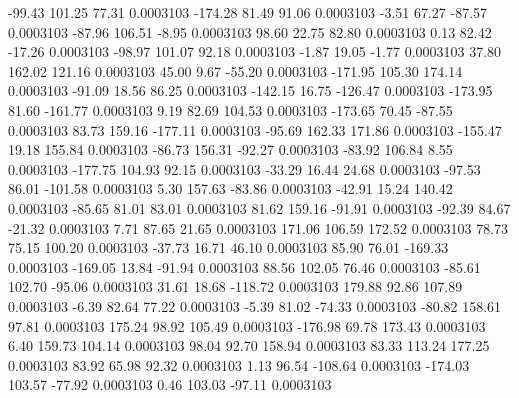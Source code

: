       -99.43      101.25       77.31     0.0003103
     -174.28       81.49       91.06     0.0003103
       -3.51       67.27      -87.57     0.0003103
      -87.96      106.51       -8.95     0.0003103
       98.60       22.75       82.80     0.0003103
        0.13       82.42      -17.26     0.0003103
      -98.97      101.07       92.18     0.0003103
       -1.87       19.05       -1.77     0.0003103
       37.80      162.02      121.16     0.0003103
       45.00        9.67      -55.20     0.0003103
     -171.95      105.30      174.14     0.0003103
      -91.09       18.56       86.25     0.0003103
     -142.15       16.75     -126.47     0.0003103
     -173.95       81.60     -161.77     0.0003103
        9.19       82.69      104.53     0.0003103
     -173.65       70.45      -87.55     0.0003103
       83.73      159.16     -177.11     0.0003103
      -95.69      162.33      171.86     0.0003103
     -155.47       19.18      155.84     0.0003103
      -86.73      156.31      -92.27     0.0003103
      -83.92      106.84        8.55     0.0003103
     -177.75      104.93       92.15     0.0003103
      -33.29       16.44       24.68     0.0003103
      -97.53       86.01     -101.58     0.0003103
        5.30      157.63      -83.86     0.0003103
      -42.91       15.24      140.42     0.0003103
      -85.65       81.01       83.01     0.0003103
       81.62      159.16      -91.91     0.0003103
      -92.39       84.67      -21.32     0.0003103
        7.71       87.65       21.65     0.0003103
      171.06      106.59      172.52     0.0003103
       78.73       75.15      100.20     0.0003103
      -37.73       16.71       46.10     0.0003103
       85.90       76.01     -169.33     0.0003103
     -169.05       13.84      -91.94     0.0003103
       88.56      102.05       76.46     0.0003103
      -85.61      102.70      -95.06     0.0003103
       31.61       18.68     -118.72     0.0003103
      179.88       92.86      107.89     0.0003103
       -6.39       82.64       77.22     0.0003103
       -5.39       81.02      -74.33     0.0003103
      -80.82      158.61       97.81     0.0003103
      175.24       98.92      105.49     0.0003103
     -176.98       69.78      173.43     0.0003103
        6.40      159.73      104.14     0.0003103
       98.04       92.70      158.94     0.0003103
       83.33      113.24      177.25     0.0003103
       83.92       65.98       92.32     0.0003103
        1.13       96.54     -108.64     0.0003103
     -174.03      103.57      -77.92     0.0003103
        0.46      103.03      -97.11     0.0003103
